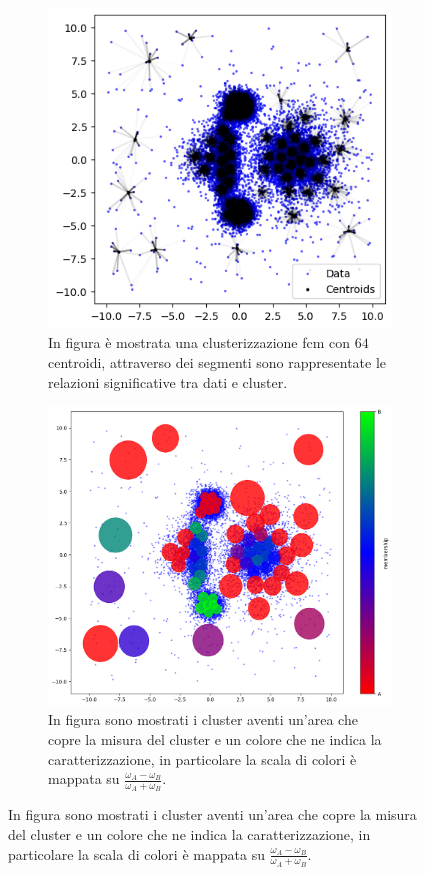 \begin{figure}[H]
\begin{subfigure}{0.45\linewidth}
		\includegraphics[width=\linewidth]{Figures/fcm_2D_fcm.png}
		\caption[Application of fcm distance - fcm application]{In figura è mostrata una clusterizzazione \gls{fcm} con $64$ centroidi, attraverso dei segmenti sono rappresentate le relazioni significative tra dati e cluster.}
		\label{fig:fcm_2D_fcm}
	\end{subfigure}
	\begin{subfigure}{\linewidth}
		\includegraphics[width=\linewidth]{Figures/measure_2D_fcm.png}
		\caption[Application of fcm distance - discretisation]{In figura sono mostrati i cluster aventi un'area che copre la misura del cluster e un colore che ne indica la caratterizzazione, in particolare la scala di colori è mappata su $\frac{\omega_A-\omega_B}{\omega_A+\omega_B}$.}
		\label{fig:measure_data_2D_fcm}
	\end{subfigure}
\end{figure}

